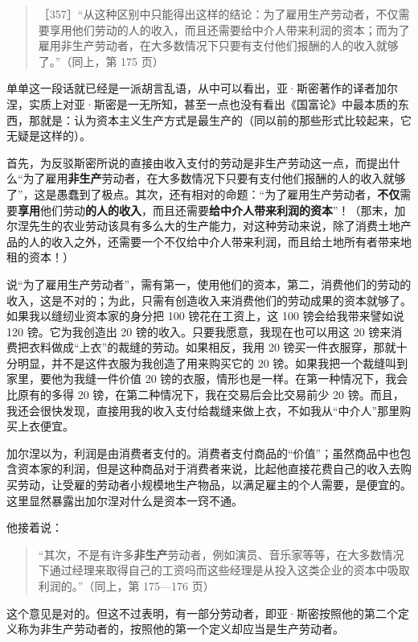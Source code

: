 \begin{quote}［357］“从这种区别中只能得出这样的结论：为了雇用生产劳动者，不仅需要享用他们劳动的人的收入，而且还需要给中介人带来利润的资本；而为了雇用非生产劳动者，在大多数情况下只要有支付他们报酬的人的收入就够了。”（同上，第 175 页）\end{quote}

单单这一段话就已经是一派胡言乱语，从中可以看出，亚·斯密著作的译者加尔涅，实质上对亚·斯密是一无所知，甚至一点也没有看出《国富论》中最本质的东西，那就是：认为资本主义生产方式是最生产的（同以前的那些形式比较起来，它无疑是这样的）。

首先，为反驳斯密所说的直接由收入支付的劳动是非生产劳动这一点，而提出什么“为了雇用\textbf{非生产}劳动者，在大多数情况下只要有支付他们报酬的人的收入就够了”，这是愚蠢到了极点。其次，还有相对的命题：“为了雇用生产劳动者，\textbf{不仅}需要\textbf{享用}他们劳动\textbf{的人的收入}，而且还需要\textbf{给中介人带来利润的资本}”！（那末，加尔涅先生的农业劳动该具有多么大的生产能力，对这种劳动来说，除了消费土地产品的人的收入之外，还需要一个不仅给中介人带来利润，而且给土地所有者带来地租的资本！）

说“为了雇用生产劳动者”，需有第一，使用他们的资本，第二，消费他们的劳动的收入，这是不对的；为此，只需有创造收入来消费他们的劳动成果的资本就够了。如果我以缝纫业资本家的身分把 100 镑花在工资上，这 100 镑会给我带来譬如说 120 镑。它为我创造出 20 镑的收入。只要我愿意，我现在也可以用这 20 镑来消费把衣料做成“上衣”的裁缝的劳动。如果相反，我用 20 镑买一件衣服穿，那就十分明显，并不是这件衣服为我创造了用来购买它的 20 镑。如果我把一个裁缝叫到家里，要他为我缝一件价值 20 镑的衣服，情形也是一样。在第一种情况下，我会比原有的多得 20 镑，在第二种情况下，我在交易后会比交易前少 20 镑。而且，我还会很快发现，直接用我的收入支付给裁缝来做上衣，不如我从“中介人”那里购买上衣便宜。

加尔涅以为，利润是由消费者支付的。消费者支付商品的“价值”；虽然商品中也包含资本家的利润，但是这种商品对于消费者来说，比起他直接花费自己的收入去购买劳动，让受雇的劳动者小规模地生产物品，以满足雇主的个人需要，是便宜的。这里显然暴露出加尔涅对什么是资本一窍不通。

他接着说：

\begin{quote}“其次，不是有许多\textbf{非生产}劳动者，例如演员、音乐家等等，在大多数情况下通过经理来取得自己的工资吗而这些经理是从投入这类企业的资本中吸取利润的。”（同上，第 175—176 页）\end{quote}

这个意见是对的。但这不过表明，有一部分劳动者，即亚·斯密按照他的第二个定义称为非生产劳动者的，按照他的第一个定义却应当是生产劳动者。

